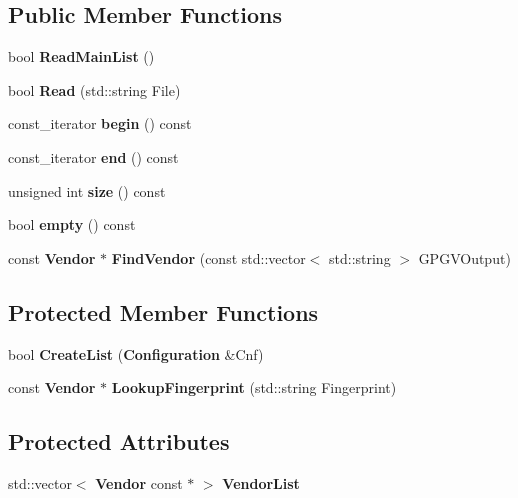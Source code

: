 \subsection*{\-Public \-Member \-Functions}
\begin{DoxyCompactItemize}
\item 
bool {\bfseries \-Read\-Main\-List} ()\label{classpkgVendorList_a2cc9bcdef680269456381b9f0dad7bdd}

\item 
bool {\bfseries \-Read} (std\-::string \-File)\label{classpkgVendorList_a71bd2521e8db5d1db37b6d52cc954a72}

\item 
const\-\_\-iterator {\bfseries begin} () const \label{classpkgVendorList_aa4b02d4f1a8500fb07a551069060709f}

\item 
const\-\_\-iterator {\bfseries end} () const \label{classpkgVendorList_a350132543d80a1c1e5be844e6d2878ea}

\item 
unsigned int {\bfseries size} () const \label{classpkgVendorList_a90ca964ebcc1b02bbcde225edd49e812}

\item 
bool {\bfseries empty} () const \label{classpkgVendorList_ac6e61de369e994009e36f344f99c15ad}

\item 
const {\bf \-Vendor} $\ast$ {\bfseries \-Find\-Vendor} (const std\-::vector$<$ std\-::string $>$ \-G\-P\-G\-V\-Output)\label{classpkgVendorList_abbab5f1d240f0b057e17f870f21520b6}

\end{DoxyCompactItemize}
\subsection*{\-Protected \-Member \-Functions}
\begin{DoxyCompactItemize}
\item 
bool {\bfseries \-Create\-List} ({\bf \-Configuration} \&\-Cnf)\label{classpkgVendorList_a665c93cef7e7151b4949920ed694751f}

\item 
const {\bf \-Vendor} $\ast$ {\bfseries \-Lookup\-Fingerprint} (std\-::string \-Fingerprint)\label{classpkgVendorList_aa9258c303e71181a9f9e0bac40d0b01d}

\end{DoxyCompactItemize}
\subsection*{\-Protected \-Attributes}
\begin{DoxyCompactItemize}
\item 
std\-::vector$<$ {\bf \-Vendor} const $\ast$ $>$ {\bfseries \-Vendor\-List}\label{classpkgVendorList_a83ea83d238add2ade64e50b4554f82a9}

\end{DoxyCompactItemize}


